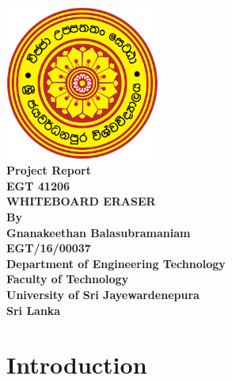 \documentclass[12pt,a4paper,oneside]{article}
\begin{document}
\begin{titlepage}

\begin{flushright}
\end{flushright}


\center %
{
\includegraphics[width=2in,keepaspectratio]{logo.png}\\[0.5cm]
\fontsize{16pt}{24}\selectfont \textbf{Project Report}\\[0.5cm]
\fontsize{16pt}{24}\selectfont \textbf{EGT 41206}\\[0.75cm]
\fontsize{24pt}{30}\selectfont \textbf{\uppercase{Whiteboard Eraser}}\\[1.5cm]
\fontsize{16pt}{24}\selectfont \textbf{By}\\[0.5cm]
\fontsize{12pt}{12}\selectfont {
}
\vspace{1.5cm}
\fontsize{12pt}{12}\selectfont \textbf { Gnanakeethan Balasubramaniam \\ EGT/16/00037}\\[0.5cm]


\vspace*{\fill}
\fontsize{12pt}{12}\selectfont \textbf {Department of Engineering Technology \\ Faculty of Technology\\University of Sri Jayewardenepura\\ Sri Lanka}\\[0.5cm]
}


\end{titlepage}



\newpage
\tableofcontents

\listoffigures
\newpage
{}
\setcounter{page}{1}


\section{Introduction}
\end{document}
